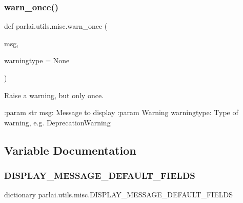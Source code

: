\subsubsection{\texorpdfstring{warn\+\_\+once()}{warn\_once()}}
{\footnotesize\ttfamily def parlai.\+utils.\+misc.\+warn\+\_\+once (\begin{DoxyParamCaption}\item[{}]{msg,  }\item[{}]{warningtype = {\ttfamily None} }\end{DoxyParamCaption})}

\begin{DoxyVerb}Raise a warning, but only once.

:param str msg: Message to display
:param Warning warningtype: Type of warning, e.g. DeprecationWarning
\end{DoxyVerb}
 

\subsection{Variable Documentation}
\mbox{\label{namespaceparlai_1_1utils_1_1misc_a3817c467f1d894060a5f5b3954d99598}} 
\subsubsection{\texorpdfstring{D\+I\+S\+P\+L\+A\+Y\+\_\+\+M\+E\+S\+S\+A\+G\+E\+\_\+\+D\+E\+F\+A\+U\+L\+T\+\_\+\+F\+I\+E\+L\+DS}{DISPLAY\_MESSAGE\_DEFAULT\_FIELDS}}
{\footnotesize\ttfamily dictionary parlai.\+utils.\+misc.\+D\+I\+S\+P\+L\+A\+Y\+\_\+\+M\+E\+S\+S\+A\+G\+E\+\_\+\+D\+E\+F\+A\+U\+L\+T\+\_\+\+F\+I\+E\+L\+DS}

